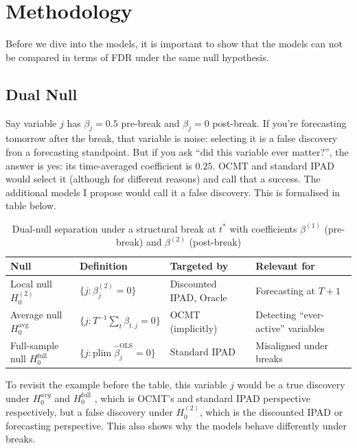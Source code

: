 \documentclass[12pt, a4paper]{article}
\begin{document}
\section{Methodology}

Before we dive into the models, it is important to show that the models can not be compared in terms of FDR under the same null hypothesis.

\subsection{Dual Null}

Say variable $j$ has $\beta_j = 0.5$ pre-break and $\beta_j = 0$ post-break. If you're forecasting tomorrow after the break, that variable is noise: selecting it is a false discovery fron a forecasting standpoint. But if you ask ``did this variable ever matter?'', the answer is yes: its time-averaged coefficient is $0.25$. OCMT and standard IPAD would select it (although for different reasons) and call that a success. The additional models I propose would call it a false discovery. This is formalised in table below.

\begin{table}[H]
\centering
\caption{Dual-null separation under a structural break at $t^*$ with coefficients $\beta^{(1)}$ (pre-break) and $\beta^{(2)}$ (post-break)}
\label{tab:dualnull}
\small
\begin{tabular}{L{2.8cm} L{5cm} L{3cm} L{3.5cm}}
\toprule
\textbf{Null} & \textbf{Definition} & \textbf{Targeted by} & \textbf{Relevant for} \\
\midrule
Local null $H_0^{(2)}$ & $\{j : \beta_j^{(2)} = 0\}$ & Discounted IPAD, Oracle & Forecasting at $T+1$ \\[4pt]
Average null $H_0^{\text{avg}}$ & $\{j : T^{-1} \sum_t \beta_{t,j} = 0\}$ & OCMT (implicitly) & Detecting ``ever-active'' variables \\[4pt]
Full-sample null $H_0^{\text{full}}$ & $\{j : \text{plim}\;\hat{\beta}_j^{\text{OLS}} = 0\}$ & Standard IPAD & Misaligned under breaks \\
\bottomrule
\end{tabular}
\end{table}

To revisit the example before the table, this variable $j$ would be a true discovery under $H_0^{avg}$ and  $H_0^{\text{full}}$ , which is OCMT's and standard IPAD perspective respectively, but a false discovery under $H_0^{(2)}$, which is the discounted IPAD or forecasting perspective. This also shows why the models behave differently under breaks.
\end{document}

